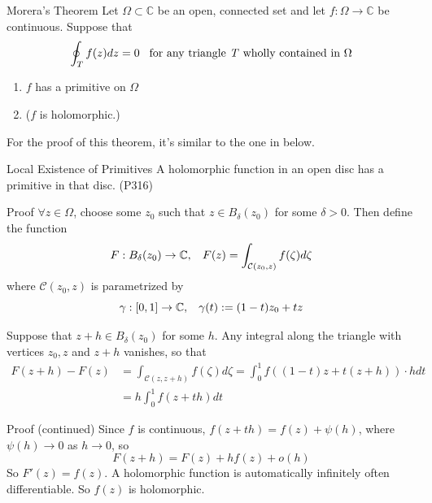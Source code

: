 \documentclass{beamer}
\begin{document}
\begin{frame}

\begin{block}{Morera's Theorem}
Let $\Omega\subset\mathbb{C}$ be an open, connected set and let $f : \Omega \rightarrow \mathbb{C}$ be continuous. Suppose that 
$$\oint_Tf(z) dz = 0\hspace{3mm} \text{for any triangle \textit{T} wholly contained in }\Omega$$
\begin{enumerate}
\item $f$ has a primitive on $\Omega$
\item ($f$ is holomorphic.) 
\end{enumerate}
\end{block}
For the proof of this theorem, it's similar to the one in below.
\begin{block}{Local Existence of Primitives}
A holomorphic function in an open disc has a primitive in that disc. (P316)
\end{block}
\end{frame}


\begin{frame}
\begin{block}{Proof}
$\forall z\in\Omega$, choose some $z_0$ such that $z\in B_{\delta}(z_0)$ for some $\delta>0$. Then define the function
$$F:B_{\delta}(z_0)\rightarrow\mathbb{C},\hspace{3mm}F(z)=\int_{\mathcal{C}(z_0,z)}f(\zeta)d\zeta$$
where $\mathcal{C}(z_0,z)$ is parametrized by 
$$\gamma:[0,1]\rightarrow\mathbb{C},\hspace{3mm}\gamma(t):=(1-t)z_0+tz$$

Suppose that $z+h\in B_{\delta}(z_0)$ for some $h$. Any integral along the triangle with vertices $z_0,z$ and $z+h$ vanishes, so that
\begin{align*}
F(z+h)-F(z)&=\int_{\mathcal{C}(z,z+h)}f(\zeta)d\zeta=\int_0^1f((1-t)z+t(z+h))\cdot hdt\\
&=h\int_0^1f(z+th)dt
\end{align*}
\end{block}
\end{frame}

\begin{frame}
\begin{block}{Proof (continued)}
Since $f$ is continuous, $f(z+th)=f(z)+\psi(h)$, where $\psi(h)\rightarrow0$ as $h\rightarrow0$, so
$$F(z+h)=F(z)+hf(z)+o(h)$$
So $F'(z)=f(z)$. A holomorphic function is automatically infinitely often differentiable. So $f(z)$ is holomorphic.
\end{block}
\end{frame}
\end{document}
